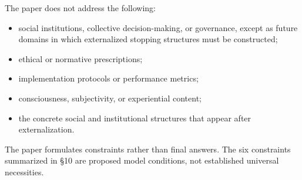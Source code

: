The paper does not address the following:

\begin{itemize}
\item social institutions, collective decision-making, or governance, except as future domains in which externalized stopping structures must be constructed;
\item ethical or normative prescriptions;
\item implementation protocols or performance metrics;
\item consciousness, subjectivity, or experiential content;
\item the concrete social and institutional structures that appear after externalization.
\end{itemize}

The paper formulates constraints rather than final answers. The six constraints summarized in \S{}10 are proposed model conditions, not established universal necessities.
